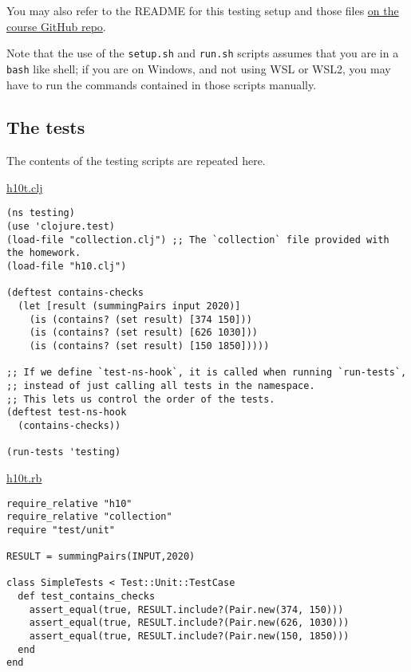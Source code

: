 \documentclass[11pt]{article}
\begin{document}
You may also refer to the README
for this testing setup and those files
\href{https://github.com/armkeh/principles-of-programming-languages/tree/master/homework/testing/h10}{on the course GitHub repo}.

Note that the use of the \texttt{setup.sh} and \texttt{run.sh} scripts assumes
that you are in a \texttt{bash} like shell; if you are on Windows,
and not using WSL or WSL2, you may have
to run the commands contained in those scripts manually.

\subsection*{The tests}
\label{sec:org2e2144f}
The contents of the testing scripts are repeated here.

\href{./testing/h10/h10t.clj}{h10t.clj}
\begin{verbatim}
(ns testing)
(use 'clojure.test)
(load-file "collection.clj") ;; The `collection` file provided with the homework.
(load-file "h10.clj")

(deftest contains-checks
  (let [result (summingPairs input 2020)]
    (is (contains? (set result) [374 150]))
    (is (contains? (set result) [626 1030]))
    (is (contains? (set result) [150 1850]))))

;; If we define `test-ns-hook`, it is called when running `run-tests`,
;; instead of just calling all tests in the namespace.
;; This lets us control the order of the tests.
(deftest test-ns-hook
  (contains-checks))

(run-tests 'testing)
\end{verbatim}

\href{./testing/h10/h10t.rb}{h10t.rb}
\begin{verbatim}
require_relative "h10"
require_relative "collection"
require "test/unit"

RESULT = summingPairs(INPUT,2020)

class SimpleTests < Test::Unit::TestCase
  def test_contains_checks
    assert_equal(true, RESULT.include?(Pair.new(374, 150)))
    assert_equal(true, RESULT.include?(Pair.new(626, 1030)))
    assert_equal(true, RESULT.include?(Pair.new(150, 1850)))
  end
end
\end{verbatim}
\end{document}
